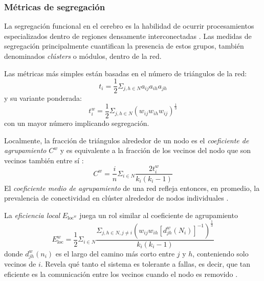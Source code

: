 \subsubsection{Métricas de segregación}
La segregación funcional en el cerebro es la habilidad de ocurrir procesamientos especializados dentro de regiones densamente interconectadas \parencite{Tononi1994}.
Las medidas de segregación principalmente cuantifican la presencia de estos grupos, también denominados \textit{clústers} o módulos, dentro de la red. \par
Las métricas más simples están basadas en el número de triángulos de la red:
\begin{equation}\label{eqTriangles1}
    t_i=\frac{1}{2}\Sigma_{j,h \in N}a_{ij}a_{ih}a_{jh}
\end{equation}
y su variante ponderada:
\begin{equation}\label{eqTriangles2}
    t_i^w=\frac{1}{2}\Sigma_{j,h \in N}(w_{ij}w_{ih}w_{ij})^{\frac{1}{3}}
\end{equation}
con un mayor número implicando segregación.\par
Localmente, la fracción de triángulos alrededor de un nodo es el \emph{coeficiente de agrupamiento} $C^w$ y es equivalente a la fracción de los vecinos del nodo que son vecinos también entre sí \parencite{Watts1998,Onnela2005}:
\begin{equation}\label{eqClusterCoeff}
    C^w=\frac{i}{n}\Sigma_{i \in N}\frac{2t_i^w}{k_i(k_i-1)}
\end{equation}
El \emph{coeficiente medio de agrupamiento} de una red refleja entonces, en promedio, la prevalencia de conectividad en clúster alrededor de nodos individuales \parencite{Rubinov2010}. \par
La \emph{eficiencia local} $E_{\text{loc}^w}$ juega un rol similar al coeficiente de agrupamiento
\begin{equation}\label{eqEloc}
    E_{\text{loc}}^w=\frac{1}{2}\Sigma_{i \in N}\frac{\Sigma_{j,h \in N, j \neq i}(w_{ij}w_{ih}[d_{jh}^w(N_i)]^{-1})^\frac{1}{3}}{k_i(k_i-1)}
\end{equation}
donde $d_{jh}^w(n_i)$ es el largo del camino más corto entre $j$ y $h$, conteniendo solo vecinos de $i$. Revela qué tanto el sistema es tolerante a fallas, es decir, que tan eficiente es la comunicación entre los vecinos cuando el nodo es removido \parencite{Latora2001}.

